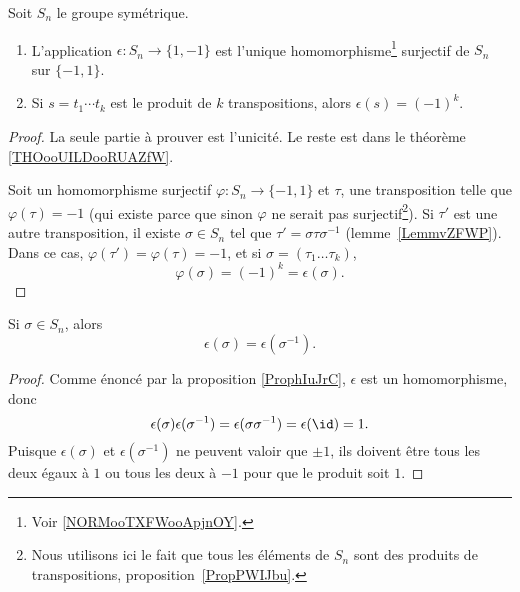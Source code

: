 \begin{proposition}  \label{ProphIuJrC}
	Soit \( S_n\) le groupe symétrique.
	\begin{enumerate}
		\item       \label{ITEMooBQKUooFTkvSu}
		      L'application \( \epsilon\colon S_n\to \{ 1,-1 \}\) est l'unique homomorphisme\footnote{Voir \ref{NORMooTXFWooApjnOY}.} surjectif de \( S_n\) sur \( \{ -1,1 \}\).
		\item
		      Si \( s=t_1\cdots t_k\) est le produit de \( k\) transpositions, alors \( \epsilon(s)=(-1)^k\).
	\end{enumerate}
\end{proposition}

\begin{proof}
	La seule partie à prouver est l'unicité. Le reste est dans le théorème \ref{THOooUILDooRUAZfW}.

	Soit un homomorphisme surjectif \( \varphi\colon S_n\to \{ -1,1 \}\) et \( \tau\), une transposition telle que \( \varphi(\tau)=-1\) (qui existe parce que sinon \( \varphi\) ne serait pas surjectif\footnote{Nous utilisons ici le fait que tous les éléments de \( S_n\) sont des produits de transpositions, proposition~\ref{PropPWIJbu}.}). Si \( \tau'\) est une autre transposition, il existe \( \sigma\in S_n\) tel que \( \tau'=\sigma\tau\sigma^{-1}\) (lemme~\ref{LemmvZFWP}). Dans ce cas, \( \varphi(\tau')=\varphi(\tau)=-1\), et si \( \sigma=(\tau_1\ldots \tau_k) \),
	\begin{equation}
		\varphi(\sigma)=(-1)^k=\epsilon(\sigma).
	\end{equation}
\end{proof}

\begin{corollary}       \label{CORooZLUKooBOhUPG}
	Si \( \sigma\in S_n\), alors
	\begin{equation}
		\epsilon(\sigma)=\epsilon(\sigma^{-1}).
	\end{equation}
\end{corollary}

\begin{proof}
	Comme énoncé par la proposition \ref{ProphIuJrC}, \( \epsilon\) est un homomorphisme, donc
	\begin{equation}
		\epsilon(\sigma)\epsilon(\sigma^{-1})=\epsilon(\sigma\sigma^{-1})=\epsilon(\id)=1.
	\end{equation}
	Puisque \( \epsilon(\sigma)\) et \( \epsilon(\sigma^{-1})\) ne peuvent valoir que \( \pm1\), ils doivent être tous les deux égaux à \( 1\) ou tous les deux à \( -1\) pour que le produit soit \( 1\).
\end{proof}

